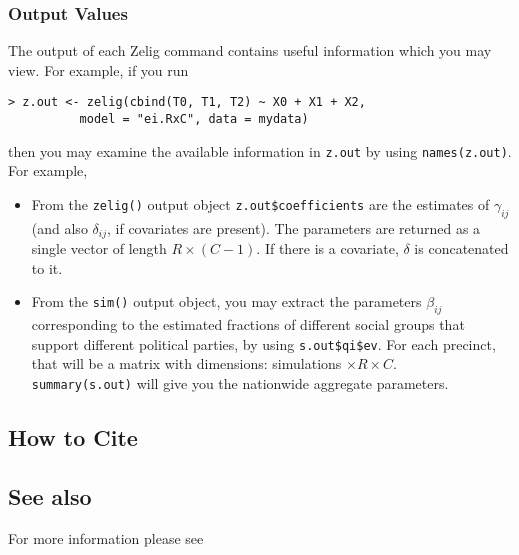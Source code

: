 \subsubsection{Output Values}

The output of each Zelig command contains useful information which you may
view. For example, if you run
\begin{verbatim}
> z.out <- zelig(cbind(T0, T1, T2) ~ X0 + X1 + X2, 
          model = "ei.RxC", data = mydata)
\end{verbatim}

\noindent then you may examine the available information in
\texttt{z.out} by using \texttt{names(z.out)}.  For example,

\begin{itemize}
\item From the \texttt{zelig()} output object
  \texttt{z.out\$coefficients} are the estimates of $\gamma_{ij}$ (and
  also $\delta_{ij}$, if covariates are present). The parameters are
  returned as a single vector of length $R\times (C-1)$. If there is a
  covariate, $\delta$ is concatenated to it.

\item From the \texttt{sim()} output object, you may extract the
  parameters $\beta_{ij}$ corresponding to the estimated fractions of
  different social groups that support different political parties, by
  using \texttt{s.out\$qi\$ev}.  For each precinct, that will be a
  matrix with dimensions: simulations $\times R \times C$. \\ 
  \texttt{summary(s.out)} will give you the nationwide aggregate parameters.
\end{itemize}

\subsection*{How to Cite}


\subsection*{See also}
For more information please see \cite{RosJiaKin01}
